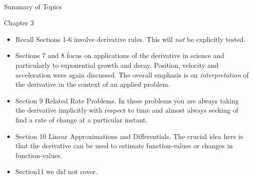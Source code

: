 \documentclass[11pt,fleqn]{article}
\newcommand{\bc}{\begin{center}}
\newcommand{\ec}{\end{center}}
\begin{document}
\vspace*{-0.7in}

\begin{center}
  \large
  \\
\end{center}


\bc Summary of Topics \ec
Chapter 3\\
\begin{itemize}
	\item Recall Sections 1-6 involve derivative rules. This will \emph{not} be explicitly tested.
	\item Sections 7 and 8 focus on applications of the derivative in science and particularly to exponential growth and decay. Position, velocity and acceleration were again discussed. The overall emphasis is on \emph{interpretation} of the derivative in the context of an applied problem.
	\item Section 9 Related Rate Problems. In these problems you are always taking the derivative implicitly with respect to time and almost always seeking of find a rate of change at a particular instant.
	\item Section 10 Linear Approximations and Differentials. The crucial idea here is that the derivative can be used to estimate function-values or changes in function-values.
	\item Section11 we did not cover.
\end{itemize}
\end{document}

